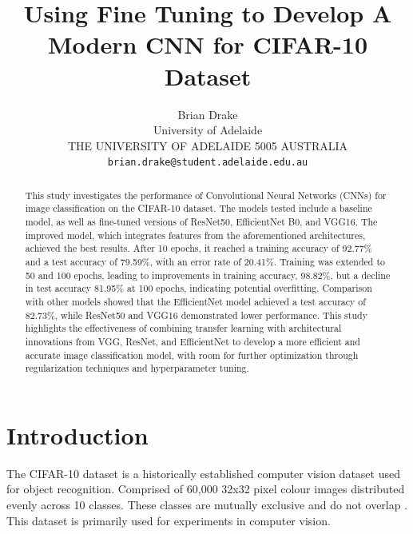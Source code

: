 \documentclass[10pt,twocolumn,letterpaper]{article}
\begin{document}
\title{Using Fine Tuning to Develop A Modern CNN for CIFAR-10 Dataset}

\author{Brian Drake\\
University of Adelaide\\
THE UNIVERSITY OF ADELAIDE
5005 AUSTRALIA\\
{\tt\small brian.drake@student.adelaide.edu.au}
}
\maketitle

\begin{abstract}
This study investigates the performance of Convolutional Neural Networks (CNNs) for image classification on the CIFAR-10 dataset. The models tested include a baseline model, as well as fine-tuned versions of ResNet50, EfficientNet B0, and VGG16. The improved model, which integrates features from the aforementioned architectures, achieved the best results. After 10 epochs, it reached a training accuracy of 92.77\% and a test accuracy of 79.59\%, with an error rate of 20.41\%. Training was extended to 50 and 100 epochs, leading to improvements in training accuracy, 98.82\%, but a decline in test accuracy 81.95\% at 100 epochs, indicating potential overfitting. Comparison with other models showed that the EfficientNet model achieved a test accuracy of 82.73\%, while ResNet50 and VGG16 demonstrated lower performance. This study highlights the effectiveness of combining transfer learning with architectural innovations from VGG, ResNet, and EfficientNet to develop a more efficient and accurate image classification model, with room for further optimization through regularization techniques and hyperparameter tuning.
\end{abstract}

\section{Introduction}
\label{sec:intro}
The CIFAR-10 dataset is a historically established computer vision dataset used for object recognition. Comprised of 60,000 32x32 pixel colour images distributed evenly across 10 classes. These classes are mutually exclusive and do not overlap \cite{cifar10}. This dataset is primarily used for experiments in computer vision.
\end{document}
